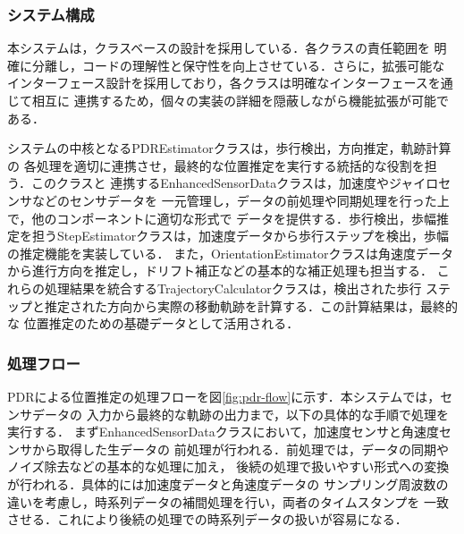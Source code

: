 \subsubsection{システム構成}

本システムは，クラスベースの設計を採用している．各クラスの責任範囲を
明確に分離し，コードの理解性と保守性を向上させている．さらに，拡張可能な
インターフェース設計を採用しており，各クラスは明確なインターフェースを通じて相互に
連携するため，個々の実装の詳細を隠蔽しながら機能拡張が可能である．

システムの中核となるPDREstimatorクラスは，歩行検出，方向推定，軌跡計算の
各処理を適切に連携させ，最終的な位置推定を実行する統括的な役割を担う．このクラスと
連携するEnhancedSensorDataクラスは，加速度やジャイロセンサなどのセンサデータを
一元管理し，データの前処理や同期処理を行った上で，他のコンポーネントに適切な形式で
データを提供する．歩行検出，歩幅推定を担うStepEstimatorクラスは，加速度データから歩行ステップを検出，歩幅の推定機能を実装している．
また，OrientationEstimatorクラスは角速度データから進行方向を推定し，ドリフト補正などの基本的な補正処理も担当する．
これらの処理結果を統合するTrajectoryCalculatorクラスは，検出された歩行
ステップと推定された方向から実際の移動軌跡を計算する．この計算結果は，最終的な
位置推定のための基礎データとして活用される．

\subsubsection{処理フロー}
PDRによる位置推定の処理フローを図\ref{fig:pdr-flow}に示す．本システムでは，センサデータの
入力から最終的な軌跡の出力まで，以下の具体的な手順で処理を実行する．
まずEnhancedSensorDataクラスにおいて，加速度センサと角速度センサから取得した生データの
前処理が行われる．前処理では，データの同期やノイズ除去などの基本的な処理に加え，
後続の処理で扱いやすい形式への変換が行われる．具体的には加速度データと角速度データの
サンプリング周波数の違いを考慮し，時系列データの補間処理を行い，両者のタイムスタンプを
一致させる．これにより後続の処理での時系列データの扱いが容易になる．

